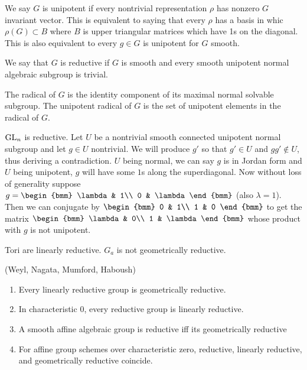 \documentclass[12pt]{article}
\begin{document}
\begin{definition}
    We say $G$ is unipotent if every nontrivial representation $\rho$ has nonzero $G$ invariant vector. This is equivalent to saying that every $\rho$ has a basis in whic $\rho(G)\subset B$ where $B$ is upper triangular matrices which have 1s on the diagonal. This is also equivalent to every $g\in G$ is unipotent for $G$ smooth.

    \hfill

    We say that $G$ is reductive if $G$ is smooth and every smooth unipotent normal algebraic subgroup is trivial.
\end{definition}
\begin{definition} The radical of $G$ is the identity component of its maximal normal solvable subgroup. The unipotent radical of $G$ is the set of unipotent elements in the radical of $G$. 
\end{definition}
\begin{example}
    $\operatorname{GL}_n$ is reductive. Let $U$ be a nontrivial smooth connected unipotent normal subgroup and let $g\in U$ nontrivial. We will produce $g'$ so that $g'\in U$ and $gg'\not\in U$, thus deriving a contradiction. $U$ being normal, we can say $g$ is in Jordan form and $U$ being unipotent, $g$ will have some $1$s along the superdiagonal. Now without loss of generality suppose $g = \begin{bmm}
        \lambda & 1\\
        0 & \lambda
    \end{bmm}$ (also $\lambda = 1$). Then we can conjugate by $\begin{bmm}
        0 & 1\\
        1 & 0 
    \end{bmm}$ to get the matrix $\begin{bmm}
        \lambda & 0\\
        1 & \lambda
    \end{bmm}$ whose product with $g$ is not unipotent.
\end{example}
\begin{example}
    Tori are linearly reductive. $G_a$ is not geometrically reductive.
\end{example}
\begin{theorem}
    (Weyl, Nagata, Mumford, Haboush)
    \begin{enumerate}
        \item Every linearly reductive group is geometrically reductive.
        \item In characteristic 0, every reductive group is linearly reductive.
        \item A smooth affine algebraic group is reductive iff its geometrically reductive
        \item For affine group schemes over characteristic zero, reductive, linearly reductive, and geometrically reductive coincide.
    \end{enumerate}
\end{theorem}
\end{document}
